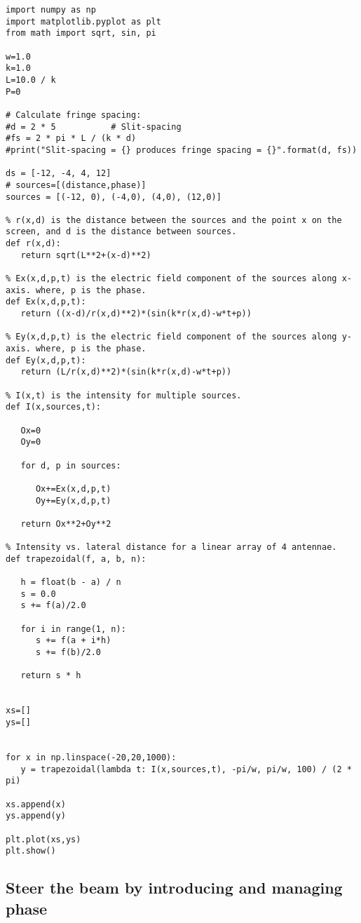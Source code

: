 \begin{Verbatim}[fontsize=\small,baselinestretch=0.9]
import numpy as np
import matplotlib.pyplot as plt
from math import sqrt, sin, pi

w=1.0
k=1.0
L=10.0 / k
P=0

# Calculate fringe spacing:
#d = 2 * 5           # Slit-spacing
#fs = 2 * pi * L / (k * d)
#print("Slit-spacing = {} produces fringe spacing = {}".format(d, fs))

ds = [-12, -4, 4, 12]
# sources=[(distance,phase)]
sources = [(-12, 0), (-4,0), (4,0), (12,0)]

% r(x,d) is the distance between the sources and the point x on the screen, and d is the distance between sources.
def r(x,d):
   return sqrt(L**2+(x-d)**2)

% Ex(x,d,p,t) is the electric field component of the sources along x-axis. where, p is the phase.
def Ex(x,d,p,t):
   return ((x-d)/r(x,d)**2)*(sin(k*r(x,d)-w*t+p))

% Ey(x,d,p,t) is the electric field component of the sources along y-axis. where, p is the phase.
def Ey(x,d,p,t):
   return (L/r(x,d)**2)*(sin(k*r(x,d)-w*t+p))

% I(x,t) is the intensity for multiple sources.
def I(x,sources,t):

   Ox=0
   Oy=0

   for d, p in sources:

      Ox+=Ex(x,d,p,t)
      Oy+=Ey(x,d,p,t)

   return Ox**2+Oy**2

% Intensity vs. lateral distance for a linear array of 4 antennae.
def trapezoidal(f, a, b, n):

   h = float(b - a) / n
   s = 0.0
   s += f(a)/2.0

   for i in range(1, n):
      s += f(a + i*h)
      s += f(b)/2.0

   return s * h


xs=[]
ys=[]


for x in np.linspace(-20,20,1000):
   y = trapezoidal(lambda t: I(x,sources,t), -pi/w, pi/w, 100) / (2 * pi)

xs.append(x)
ys.append(y)

plt.plot(xs,ys)
plt.show()   
\end{Verbatim}

\subsection{Steer the beam by introducing and managing phase}

